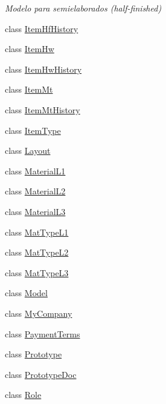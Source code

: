 \begin{DoxyCompactItemize}
\begin{DoxyCompactList}\small\item\em Modelo para semielaborados (half-\/finished) \end{DoxyCompactList}\item 
class \mbox{\hyperlink{class_h_k_supply_1_1_models_1_1_item_hf_history}{Item\+Hf\+History}}
\item 
class \mbox{\hyperlink{class_h_k_supply_1_1_models_1_1_item_hw}{Item\+Hw}}
\item 
class \mbox{\hyperlink{class_h_k_supply_1_1_models_1_1_item_hw_history}{Item\+Hw\+History}}
\item 
class \mbox{\hyperlink{class_h_k_supply_1_1_models_1_1_item_mt}{Item\+Mt}}
\item 
class \mbox{\hyperlink{class_h_k_supply_1_1_models_1_1_item_mt_history}{Item\+Mt\+History}}
\item 
class \mbox{\hyperlink{class_h_k_supply_1_1_models_1_1_item_type}{Item\+Type}}
\item 
class \mbox{\hyperlink{class_h_k_supply_1_1_models_1_1_layout}{Layout}}
\item 
class \mbox{\hyperlink{class_h_k_supply_1_1_models_1_1_material_l1}{Material\+L1}}
\item 
class \mbox{\hyperlink{class_h_k_supply_1_1_models_1_1_material_l2}{Material\+L2}}
\item 
class \mbox{\hyperlink{class_h_k_supply_1_1_models_1_1_material_l3}{Material\+L3}}
\item 
class \mbox{\hyperlink{class_h_k_supply_1_1_models_1_1_mat_type_l1}{Mat\+Type\+L1}}
\item 
class \mbox{\hyperlink{class_h_k_supply_1_1_models_1_1_mat_type_l2}{Mat\+Type\+L2}}
\item 
class \mbox{\hyperlink{class_h_k_supply_1_1_models_1_1_mat_type_l3}{Mat\+Type\+L3}}
\item 
class \mbox{\hyperlink{class_h_k_supply_1_1_models_1_1_model}{Model}}
\item 
class \mbox{\hyperlink{class_h_k_supply_1_1_models_1_1_my_company}{My\+Company}}
\item 
class \mbox{\hyperlink{class_h_k_supply_1_1_models_1_1_payment_terms}{Payment\+Terms}}
\item 
class \mbox{\hyperlink{class_h_k_supply_1_1_models_1_1_prototype}{Prototype}}
\item 
class \mbox{\hyperlink{class_h_k_supply_1_1_models_1_1_prototype_doc}{Prototype\+Doc}}
\item 
class \mbox{\hyperlink{class_h_k_supply_1_1_models_1_1_role}{Role}}

\end{DoxyCompactItemize}
